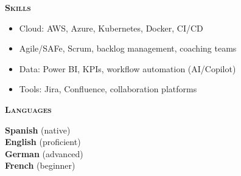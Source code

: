 \documentclass[11pt, a4paper]{article}
\newcommand{\headleft}[1]{\vspace*{2ex}\textsc{\textbf{\color{softwhite}#1}}\par%
  \vspace*{-1.2ex}{\color{softwhite}\hrulefill}\par\vspace*{0.7ex}}
\newlength{\SideBarW}
\begin{document}
\begin{minipage}[t]{\SideBarW}
\begin{minipage}[t]{\dimexpr\linewidth-8mm\relax}
    \headleft{Skills}
    \begin{itemize}[leftmargin=*, itemsep=0.5ex]
      \item Cloud: AWS, Azure, Kubernetes, Docker, CI/CD
      \item Agile/SAFe, Scrum, backlog management, coaching teams
      \item Data: Power BI, KPIs, workflow automation (AI/Copilot)
      \item Tools: Jira, Confluence, collaboration platforms
    \end{itemize}

    \headleft{Languages}
    \textbf{Spanish} (native) \\[0.5ex]
    \textbf{English} (proficient) \\[0.5ex]
    \textbf{German} (advanced) \\[0.5ex]
    \textbf{French} (beginner)
  \end{minipage}
\end{minipage}%
\hspace{3mm}%
\end{document}
